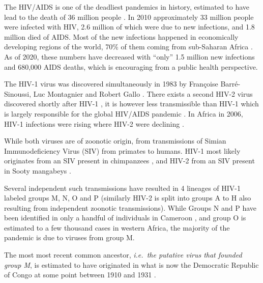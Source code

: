 \documentclass[
  11pt,
  twoside]{scrbook}
\begin{document}
The HIV/AIDS is one of the deadliest pandemics in history, estimated to have lead to the death of 36 million people \autocite{sampathPandemicsThroughoutHistory2021}. In 2010 \autocite{worldhealthorganizationGlobalReportUNAIDS2010} approximately 33 million people were infected with HIV, 2.6 million of which were due to new infections, and 1.8 million died of AIDS. Most of the new infections happened in economically developing regions of the world, 70\% of them coming from sub-Saharan Africa \autocite{worldhealthorganizationGlobalReportUNAIDS2010}. As of 2020, these numbers have decreased with ``only'' 1.5 million new infections and 680,000 AIDS deaths, which is encouraging from a public health perspective.

The HIV-1 virus was discovered simultaneously in 1983 by Françoise Barré-Sinoussi, Luc Montagnier \autocite{barre-sinoussiIsolationTlymphotropicRetrovirus1983} and Robert Gallo \autocite{galloIsolationHumanTcell1983}. There exists a second HIV-2 virus discovered shortly after HIV-1 \autocite{clavelIsolationNewHuman1986}, it is however less transmissible than HIV-1 which is largely responsible for the global HIV/AIDS pandemic \autocite{gilbert2003}. In Africa in 2006, HIV-1 infections were rising where HIV-2 were declining \autocite{vanderloeffSixteenYearsHIV2006}.

While both viruses are of zoonotic origin, from transmissions of Simian Immunodeficiency Virus (SIV) from primates to humans. HIV-1 most likely originates from an SIV present in chimpanzees \autocite{gaoOriginHIV1Chimpanzee1999,hamelTwentyYearsProspective2007,sharpOriginsHIVAIDS2011}, and HIV-2 from an SIV present in Sooty mangabeys \autocite{hirschAfricanPrimateLentivirus1989,gaoHumanInfectionGenetically1992,chenGeneticCharacterizationNew1996}.

Several independent such transmissions have resulted in 4 lineages of HIV-1 labeled groups M, N, O and P \autocite{hemelaarOriginDiversityHIV12012} (similarly HIV-2 is split into groups A to H also resulting from independent zoonotic transmissions). While Groups N and P have been identified in only a handful of individuals in Cameroon , and group O is estimated to a few thousand cases in western Africa, the majority of the pandemic is due to viruses from group M.

The most most recent common ancestor, \emph{i.e.~the putative virus that founded group M}, is estimated to have originated in what is now the Democratic Republic of Congo \autocite{worobeyDirectEvidenceExtensive2008,vidalUnprecedentedDegreeHuman2000,fariaEarlySpreadEpidemic2014} at some point between 1910 and 1931 \autocite{korberTimingAncestorHIV12000,worobeyDirectEvidenceExtensive2008,rambautCausesConsequencesHIV2004}.
\end{document}
